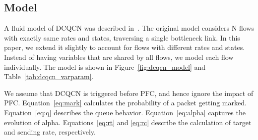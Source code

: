 \subsection{Model}

A fluid model of DCQCN was described in~\cite{dcqcn}. The original model
considers N flows with exactly same rates and states, traversing a single
bottleneck link.  In this paper, we extend it slightly to account for flows with
different rates and states.  Instead of having variables that are shared by all
flows, we model each flow individually. The model is shown in
Figure~\ref{fig:dcqcn_model} and Table~\ref{tab:dcqcn_varparam}.

We assume that DCQCN is triggered before PFC, and hence ignore the
impact of PFC. Equation~\ref{eq:mark} calculates the probability of a packet
getting marked.  Equation~\ref{eq:q} describes the queue behavior.
Equation~\ref{eq:alpha} captures the evolution of alpha.  Equations~\ref{eq:rt}
and \ref{eq:rc} describe the calculation of target and sending rate,
respectively. 


